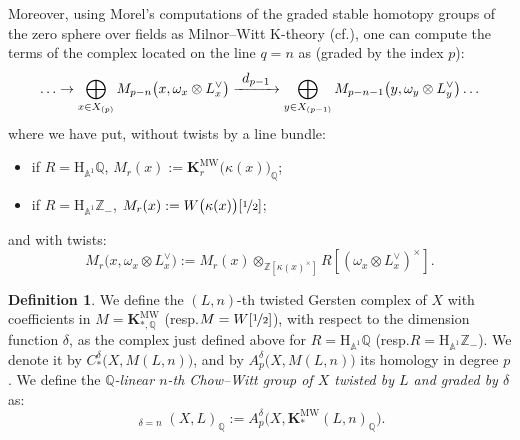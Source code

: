 \documentclass[11pt]{article}
\newcommand{\cf}{cf.\xspace}
\newcommand{\resp}{resp.\xspace}
\numberwithin{equation}{section}\renewcommand{\encodingdefault}{TU}
\def\To#1{\mathchoice{\xrightarrow{\textstyle\kern4pt#1\kern3pt}}{\stackrel{#1}{\longrightarrow}}{}{}}
\renewcommand{\AA}{\mathbb A}
\newcommand{\KMW}{\mathbf K^\mathrm{MW}}
\newcommand{\HA}{\mathrm H_{\AA^1}}
\DeclareMathOperator{\wCH}{\widetilde{CH}}
\newcommand{\ZZ} {\mathbb Z}
\newcommand{\ot} {{\nicefrac 1 2}}
\newcommand{\QQ} {\mathbb Q}
\theoremstyle{remark}
\theoremstyle{definition}
\newtheorem{df}[thm]{Definition}
\numberwithin{equation}{thm}
\begin{document}
Moreover, using Morel's computations of the graded stable homotopy groups of the zero sphere over fields
as Milnor--Witt K-theory (\cf \cite{MorelA1}),
one can compute the terms of the complex located on the line $q=n$ as (graded by the index $p$):
\begin{equation*}
\hdots \to \bigoplus_{x \in X_{(p)}} M_{p-n}\big(x,\omega_x \otimes L_x^\vee\big)
\To{d_{p-1}} \bigoplus_{y \in X_{(p-1)}} M_{p-n-1}\big(y,\omega_y \otimes L_y^\vee\big) \hdots
\end{equation*}
where we have put, without twists by a line bundle:
\begin{itemize}
\item if $R=\HA \QQ$, $M_r(x):=\KMW_r\big(\kappa(x)\big)_\QQ$;
\item if $R=\HA \ZZ_-$, $M_r(x):=W\big(\kappa(x)\big)[\ot]$;
\end{itemize}
and with twists:
\[
M_r\big(x,\omega_x \otimes L_x^\vee\big):=M_r(x) \otimes_{\ZZ[\kappa(x)^\times]} R[(\omega_x \otimes L_x^\vee)^\times].
\]

\begin{df}
\label{df:CHtilde}
We define the $(L,n)$-th twisted Gersten complex of $X$ with coefficients in $M=\KMW_{*,\QQ}$
(\resp $M=W[\ot]$),
with respect to the dimension function $\delta$, as the complex just defined above
for $R=\HA \QQ$ (\resp $R=\HA \ZZ_-$).
We denote it by $C^\delta_*\big(X,M(L,n)\big)$,
and by $A^\delta_p\big(X,M(L,n)\big)$ its homology in degree $p$.
We define the \emph{$\QQ$-linear $n$-th Chow--Witt group of $X$ twisted by $L$ and graded by $\delta$} as:
\[
\wCH_{\delta=n}(X,L)_\QQ:=A^\delta_p\big(X,\KMW_*(L,n)_\QQ\big).
\]
\end{df}
\end{document}
